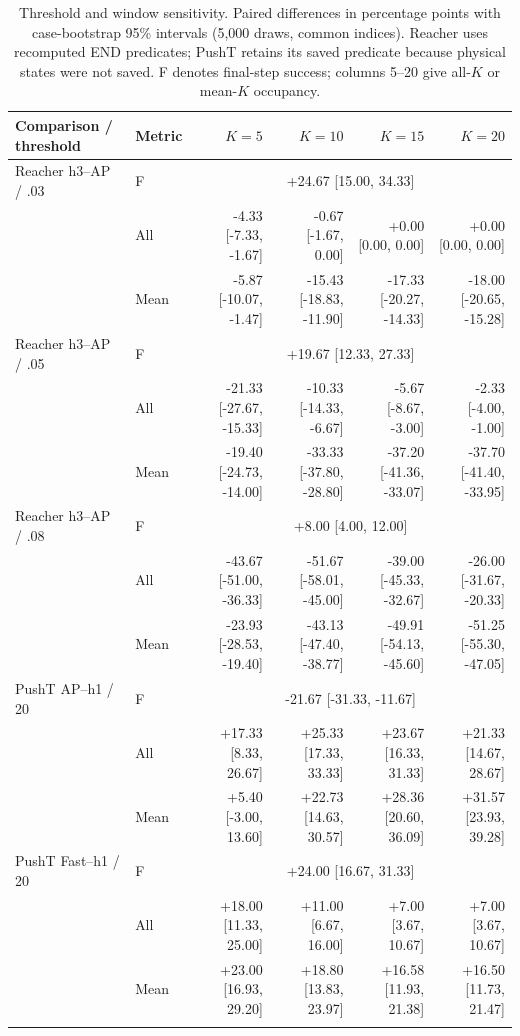 \begin{table}[p]\centering\scriptsize
\caption{Threshold and window sensitivity. Paired differences in percentage points with case-bootstrap 95\% intervals (5,000 draws, common indices). Reacher uses recomputed END predicates; PushT retains its saved predicate because physical states were not saved. F denotes final-step success; columns 5--20 give all-$K$ or mean-$K$ occupancy.}\label{tab:sensitivity-r7}
\setlength{\tabcolsep}{3pt}
\begin{tabular}{llrrrr}\toprule
Comparison / threshold & Metric & $K=5$ & $K=10$ & $K=15$ & $K=20$\\\midrule
Reacher h3--AP / .03 & F & \multicolumn{4}{c}{+24.67 [15.00, 34.33]}\\
 & All & -4.33 [-7.33, -1.67] & -0.67 [-1.67, 0.00] & +0.00 [0.00, 0.00] & +0.00 [0.00, 0.00]\\
 & Mean & -5.87 [-10.07, -1.47] & -15.43 [-18.83, -11.90] & -17.33 [-20.27, -14.33] & -18.00 [-20.65, -15.28]\\
\addlinespace
Reacher h3--AP / .05 & F & \multicolumn{4}{c}{+19.67 [12.33, 27.33]}\\
 & All & -21.33 [-27.67, -15.33] & -10.33 [-14.33, -6.67] & -5.67 [-8.67, -3.00] & -2.33 [-4.00, -1.00]\\
 & Mean & -19.40 [-24.73, -14.00] & -33.33 [-37.80, -28.80] & -37.20 [-41.36, -33.07] & -37.70 [-41.40, -33.95]\\
\addlinespace
Reacher h3--AP / .08 & F & \multicolumn{4}{c}{+8.00 [4.00, 12.00]}\\
 & All & -43.67 [-51.00, -36.33] & -51.67 [-58.01, -45.00] & -39.00 [-45.33, -32.67] & -26.00 [-31.67, -20.33]\\
 & Mean & -23.93 [-28.53, -19.40] & -43.13 [-47.40, -38.77] & -49.91 [-54.13, -45.60] & -51.25 [-55.30, -47.05]\\
\addlinespace
PushT AP--h1 / 20 & F & \multicolumn{4}{c}{-21.67 [-31.33, -11.67]}\\
 & All & +17.33 [8.33, 26.67] & +25.33 [17.33, 33.33] & +23.67 [16.33, 31.33] & +21.33 [14.67, 28.67]\\
 & Mean & +5.40 [-3.00, 13.60] & +22.73 [14.63, 30.57] & +28.36 [20.60, 36.09] & +31.57 [23.93, 39.28]\\
\addlinespace
PushT Fast--h1 / 20 & F & \multicolumn{4}{c}{+24.00 [16.67, 31.33]}\\
 & All & +18.00 [11.33, 25.00] & +11.00 [6.67, 16.00] & +7.00 [3.67, 10.67] & +7.00 [3.67, 10.67]\\
 & Mean & +23.00 [16.93, 29.20] & +18.80 [13.83, 23.97] & +16.58 [11.93, 21.38] & +16.50 [11.73, 21.47]\\
\addlinespace
\bottomrule\end{tabular}\end{table}
